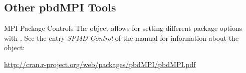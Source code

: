 \subsection{Other pbdMPI Tools}


\begin{frame}
  \begin{block}{MPI Package Controls}
The  object allows for setting different package options with .  See the entry \emph{SPMD Control} of the  manual for information about the  object:
\begin{center}
{ \small
\url{http://cran.r-project.org/web/packages/pbdMPI/pbdMPI.pdf}
}
\end{center}
  \end{block}
\end{frame}

% 
% 
% 
% 
% 


